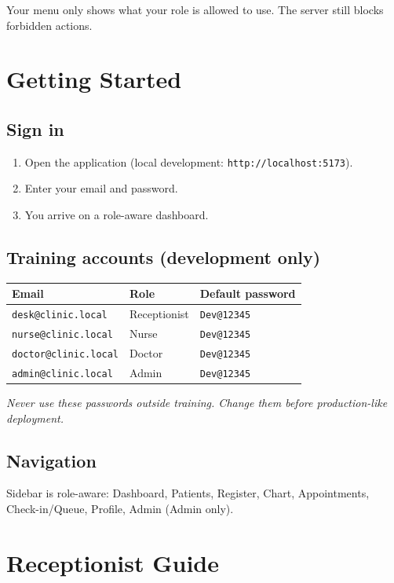 \documentclass[11pt,a4paper]{article}
\begin{document}
Your menu only shows what your role is allowed to use. The server still blocks forbidden actions.

\section{Getting Started}

\subsection{Sign in}
\begin{enumerate}
  \item Open the application (local development: \texttt{http://localhost:5173}).
  \item Enter your email and password.
  \item You arrive on a role-aware dashboard.
\end{enumerate}

\subsection{Training accounts (development only)}
\begin{tabularx}{\textwidth}{@{}X X X@{}}
\toprule
\textbf{Email} & \textbf{Role} & \textbf{Default password} \\
\midrule
\texttt{desk@clinic.local} & Receptionist & \texttt{Dev@12345} \\
\texttt{nurse@clinic.local} & Nurse & \texttt{Dev@12345} \\
\texttt{doctor@clinic.local} & Doctor & \texttt{Dev@12345} \\
\texttt{admin@clinic.local} & Admin & \texttt{Dev@12345} \\
\bottomrule
\end{tabularx}

\vspace{0.4em}
\noindent\textit{Never use these passwords outside training. Change them before production-like deployment.}

\subsection{Navigation}
Sidebar is role-aware: Dashboard, Patients, Register, Chart, Appointments, Check-in/Queue, Profile, Admin (Admin only).

\section{Receptionist Guide}
\end{document}
